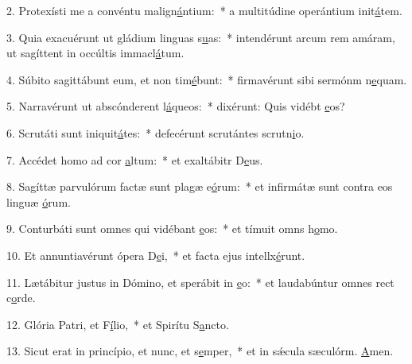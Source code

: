 2. Protexísti me a convéntu malign\uline{á}ntium:~* a multitúdine operántium init\uline{á}tem.\par 
3. Quia exacuérunt ut gládium linguas s\uline{u}as:~* intendérunt arcum rem amáram, ut sagíttent in occúltis immacl\uline{á}tum.\par 
4. Súbito sagittábunt eum, et non tim\uline{é}bunt:~* firmavérunt sibi sermónm n\uline{e}quam.\par 
5. Narravérunt ut abscónderent l\uline{á}queos:~* dixérunt: Quis vidébt \uline{e}os?\par 
6. Scrutáti sunt iniquit\uline{á}tes:~* defecérunt scrutántes scrutn\uline{i}o.\par 
7. Accédet homo ad cor \uline{a}ltum:~* et exaltábitr D\uline{e}us.\par 
8. Sagíttæ parvulórum factæ sunt plagæ e\uline{ó}rum:~* et infirmátæ sunt contra eos linguæ \uline{ó}rum.\par 
9. Conturbáti sunt omnes qui vidébant \uline{e}os:~* et tímuit omns h\uline{o}mo.\par 
10. Et annuntiavérunt ópera D\uline{e}i,~* et facta ejus intellx\uline{é}runt.\par 
11. Lætábitur justus in Dómino, et sperábit in \uline{e}o:~* et laudabúntur omnes rect c\uline{o}rde.\par 
12. Glória Patri, et F\uline{í}lio,~* et Spirítu S\uline{a}ncto.\par 
13. Sicut erat in princípio, et nunc, et s\uline{e}mper,~* et in sǽcula sæculórm. \uline{A}men.\par 
